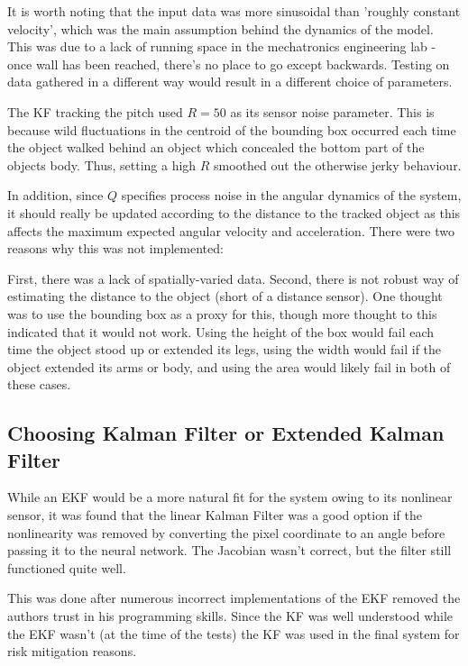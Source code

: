 It is worth noting that the input data was more sinusoidal than 'roughly constant velocity', which was the main assumption behind the dynamics of the model. This was due to a lack of running space in the mechatronics engineering lab - once wall has been reached, there's no place to go except backwards. Testing on data gathered in a different way would result in a different choice of parameters.

The KF tracking the pitch used $R=50$ as its sensor noise parameter. This is because wild fluctuations in the centroid of the bounding box occurred each time the object walked behind an object which concealed the bottom part of the objects body. Thus, setting a high $R$ smoothed out the otherwise jerky behaviour.

In addition, since $Q$ specifies process noise in the angular dynamics of the system, it should really be updated according to the distance to the tracked object as this affects the maximum expected angular velocity and acceleration. There were two reasons why this was not implemented:

First, there was a lack of spatially-varied data. Second, there is not robust way of estimating the distance to the object (short of a distance sensor). One thought was to use the bounding box as a proxy for this, though more thought to this indicated that it would not work. Using the height of the box would fail each time the object stood up or extended its legs, using the width would fail if the object extended its arms or body, and using the area would likely fail in both of these cases.

\subsection{Choosing Kalman Filter or Extended Kalman Filter}\label{sec:kf_implementation}
While an EKF would be a more natural fit for the system owing to its nonlinear sensor, it was found that the linear Kalman Filter was a good option if the nonlinearity was removed by converting the pixel coordinate to an angle before passing it to the neural network. The Jacobian wasn't correct, but the filter still functioned quite well.

This was done after numerous incorrect implementations of the EKF removed the authors trust in his programming skills. Since the KF was well understood while the EKF wasn't (at the time of the tests) the KF was used in the final system for risk mitigation reasons.
